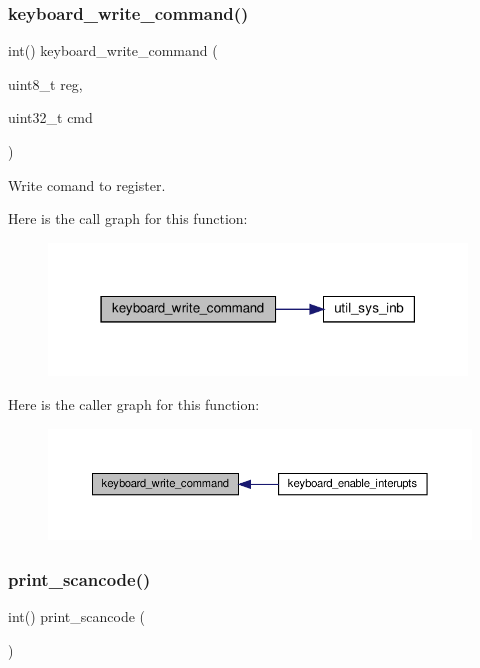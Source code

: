 \subsubsection{\texorpdfstring{keyboard\+\_\+write\+\_\+command()}{keyboard\_write\_command()}}
{\footnotesize\ttfamily int() keyboard\+\_\+write\+\_\+command (\begin{DoxyParamCaption}\item[{uint8\+\_\+t}]{reg,  }\item[{uint32\+\_\+t}]{cmd }\end{DoxyParamCaption})}



Write comand to register. 

Here is the call graph for this function\+:\nopagebreak
\begin{figure}[H]
\begin{center}
\leavevmode
\includegraphics[width=315pt]{group__keyboard_gad6f191b6116f8df3e057322f0c76b66a_cgraph}
\end{center}
\end{figure}
Here is the caller graph for this function\+:\nopagebreak
\begin{figure}[H]
\begin{center}
\leavevmode
\includegraphics[width=350pt]{group__keyboard_gad6f191b6116f8df3e057322f0c76b66a_icgraph}
\end{center}
\end{figure}
\mbox{\label{group__keyboard_ga50ccd1d4a10b2f8d6f380d3581eae423}} 
\subsubsection{\texorpdfstring{print\+\_\+scancode()}{print\_scancode()}}
{\footnotesize\ttfamily int() print\+\_\+scancode (\begin{DoxyParamCaption}{ }\end{DoxyParamCaption})}



